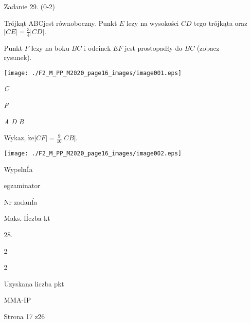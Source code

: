 \documentclass[a4paper,12pt]{article}
\begin{document}
Zadanie 29. (0-2)

Trójkąt ABCjest równoboczny. Punkt $E$ lezy na wysokości $CD$ tego trójkąta oraz $|CE|=\displaystyle \frac{3}{4}|CD|.$

Punkt $F$ lezy na boku $BC$ i odcinek $EF$ jest prostopadły do $BC$ (zobacz rysunek).
\begin{center}
\texttt{[image: ./F2\_M\_PP\_M2020\_page16\_images/image001.eps]}
\end{center}
{\it C}

{\it F}

{\it A  D  B}

Wykaz, $\displaystyle \dot{\mathrm{z}}\mathrm{e}|CF|=\frac{9}{16}|CB|.$
\begin{center}
\texttt{[image: ./F2\_M\_PP\_M2020\_page16\_images/image002.eps]}
\end{center}
WypelnÍa

egzaminator

Nr zadanÍa

Maks. lÍczba kt

28.

2

2

Uzyskana liczba pkt

MMA-IP

Strona 17 z26
\end{document}
